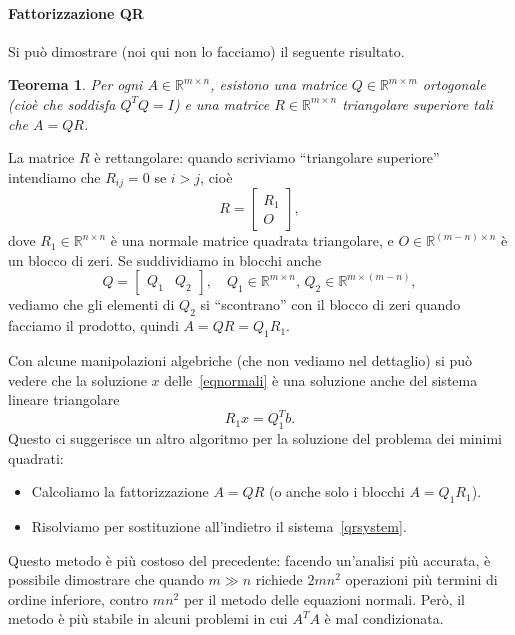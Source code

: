 \documentclass[a4paper]{report}
\newtheorem{theorem}{Teorema}[chapter]
\theoremstyle{definition}
\theoremstyle{remark}
\begin{document}
\paragraph{Fattorizzazione QR}

Si può dimostrare (noi qui non lo facciamo) il seguente risultato.
\begin{theorem}
    Per ogni $A \in \mathbb{R}^{m\times n}$, esistono una matrice $Q\in\mathbb{R}^{m\times m}$ \emph{ortogonale} (cioè che soddisfa $Q^TQ=I$) e una matrice $R \in \mathbb{R}^{m\times n}$ triangolare superiore tali che $A = QR$.
\end{theorem}
La matrice $R$ è rettangolare: quando scriviamo ``triangolare superiore'' intendiamo che $R_{ij}=0$ se $i>j$, cioè
\[
R = \begin{bmatrix}
    R_1\\ O
\end{bmatrix},
\]
dove $R_1 \in \mathbb{R}^{n\times n}$ è una normale matrice quadrata triangolare, e $O\in\mathbb{R}^{(m-n)\times n}$ è un blocco di zeri. Se suddividiamo in blocchi anche
\[
Q = \begin{bmatrix}
    Q_1 & Q_2
\end{bmatrix}, \quad Q_1 \in \mathbb{R}^{m\times n}, \, Q_2 \in \mathbb{R}^{m\times (m-n)},
\]
vediamo che gli elementi di $Q_2$ si ``scontrano'' con il blocco di zeri quando facciamo il prodotto, quindi $A = QR = Q_1 R_1$.

Con alcune manipolazioni algebriche (che non vediamo nel dettaglio) si può vedere che la soluzione $x$ delle~\eqref{eqnormali} è una soluzione anche del sistema lineare triangolare
\begin{equation} \label{qrsystem}
    R_1 x = Q_1^T b.    
\end{equation}
Questo ci suggerisce un altro algoritmo per la soluzione del problema dei minimi quadrati:
\begin{itemize}
    \item Calcoliamo la fattorizzazione $A=QR$ (o anche solo i blocchi $A = Q_1 R_1$).
    \item Risolviamo per sostituzione all'indietro il sistema~\eqref{qrsystem}.
\end{itemize}
Questo metodo è più costoso del precedente: facendo un'analisi più accurata, è possibile dimostrare che quando $m\gg n$ richiede $2mn^2$ operazioni più termini di ordine inferiore, contro $mn^2$ per il metodo delle equazioni normali. Però, il metodo è più stabile in alcuni problemi in cui $A^TA$ è mal condizionata.
\end{document}
